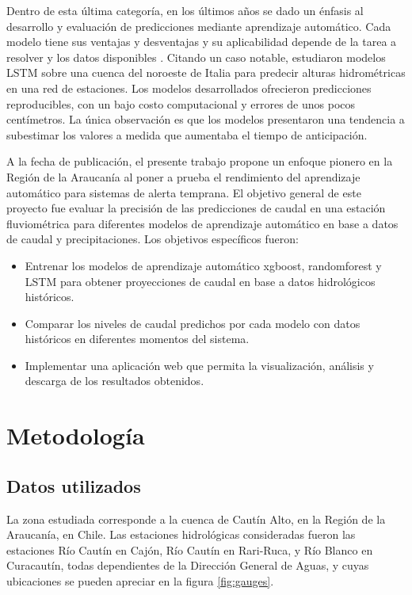 \documentclass[hess, manuscript]{copernicus}
\begin{document}
Dentro de esta última categoría, en los últimos años se dado un énfasis al desarrollo y evaluación de predicciones mediante aprendizaje automático. Cada modelo tiene sus ventajas y desventajas y su aplicabilidad depende de la tarea a resolver y los datos disponibles \citep{fischer_impact_2025}. Citando un caso notable, \citet{luppichini_machine_2024} estudiaron modelos LSTM sobre una cuenca del noroeste de Italia para predecir alturas hidrométricas en una red de estaciones. Los modelos desarrollados ofrecieron predicciones reproducibles, con un bajo costo computacional y errores de unos pocos centímetros. La única observación es que los modelos presentaron una tendencia a subestimar los valores a medida que aumentaba el tiempo de anticipación.

A la fecha de publicación, el presente trabajo propone un enfoque pionero en la Región de la Araucanía al poner a prueba el rendimiento del aprendizaje automático para sistemas de alerta temprana. El objetivo general de este proyecto fue evaluar la precisión de las predicciones de caudal en una estación fluviométrica para diferentes modelos de aprendizaje automático en base a datos de caudal y precipitaciones. Los objetivos específicos fueron:
\begin{itemize}
  \item Entrenar los modelos de aprendizaje automático xgboost, randomforest y LSTM para obtener proyecciones de caudal en base a datos hidrológicos históricos.
  \item Comparar los niveles de caudal predichos por cada modelo con datos históricos en diferentes momentos del sistema.
  \item Implementar una aplicación web que permita la visualización, análisis y descarga de los resultados obtenidos.
\end{itemize}

\section{Metodología}
\label{sec:Metodologia}

\subsection{Datos utilizados}
La zona estudiada corresponde a la cuenca de Cautín Alto, en la Región de la Araucanía, en Chile. Las estaciones hidrológicas consideradas fueron las estaciones Río Cautín en Cajón, Río Cautín en Rari-Ruca, y Río Blanco en Curacautín, todas dependientes de la Dirección General de Aguas, y cuyas ubicaciones se pueden apreciar en la figura \ref{fig:gauges}.
\end{document}
